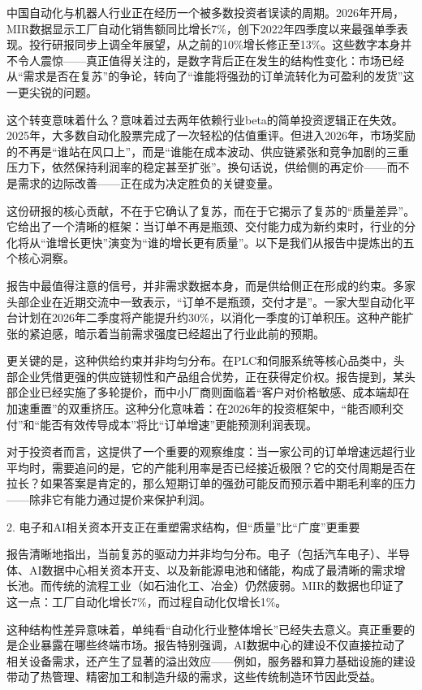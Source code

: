 \documentclass[11pt]{ctexart}
\begin{document}
中国自动化与机器人行业正在经历一个被多数投资者误读的周期。2026年开局，MIR数据显示工厂自动化销售额同比增长7\%，创下2022年四季度以来最强单季表现。投行研报同步上调全年展望，从之前的10\%增长修正至13\%。这些数字本身并不令人震惊——真正值得关注的，是数字背后正在发生的结构性变化：市场已经从“需求是否在复苏”的争论，转向了“谁能将强劲的订单流转化为可盈利的发货”这一更尖锐的问题。

这个转变意味着什么？意味着过去两年依赖行业beta的简单投资逻辑正在失效。2025年，大多数自动化股票完成了一次轻松的估值重评。但进入2026年，市场奖励的不再是“谁站在风口上”，而是“谁能在成本波动、供应链紧张和竞争加剧的三重压力下，依然保持利润率的稳定甚至扩张”。换句话说，供给侧的再定价——而不是需求的边际改善——正在成为决定胜负的关键变量。

这份研报的核心贡献，不在于它确认了复苏，而在于它揭示了复苏的“质量差异”。它给出了一个清晰的框架：当订单不再是瓶颈、交付能力成为新约束时，行业的分化将从“谁增长更快”演变为“谁的增长更有质量”。以下是我们从报告中提炼出的五个核心洞察。

报告中最值得注意的信号，并非需求数据本身，而是供给侧正在形成的约束。多家头部企业在近期交流中一致表示，“订单不是瓶颈，交付才是”。一家大型自动化平台计划在2026年二季度将产能提升约30\%，以消化一季度的订单积压。这种产能扩张的紧迫感，暗示着当前需求强度已经超出了行业此前的预期。

更关键的是，这种供给约束并非均匀分布。在PLC和伺服系统等核心品类中，头部企业凭借更强的供应链韧性和产品组合优势，正在获得定价权。报告提到，某头部企业已经实施了多轮提价，而中小厂商则面临着“客户对价格敏感、成本端却在加速重置”的双重挤压。这种分化意味着：在2026年的投资框架中，“能否顺利交付”和“能否有效传导成本”将比“订单增速”更能预测利润表现。

对于投资者而言，这提供了一个重要的观察维度：当一家公司的订单增速远超行业平均时，需要追问的是，它的产能利用率是否已经接近极限？它的交付周期是否在拉长？如果答案是肯定的，那么短期订单的强劲可能反而预示着中期毛利率的压力——除非它有能力通过提价来保护利润。

2. 电子和AI相关资本开支正在重塑需求结构，但“质量”比“广度”更重要

报告清晰地指出，当前复苏的驱动力并非均匀分布。电子（包括汽车电子）、半导体、AI数据中心相关资本开支、以及新能源电池和储能，构成了最清晰的需求增长池。而传统的流程工业（如石油化工、冶金）仍然疲弱。MIR的数据也印证了这一点：工厂自动化增长7\%，而过程自动化仅增长1\%。

这种结构性差异意味着，单纯看“自动化行业整体增长”已经失去意义。真正重要的是企业暴露在哪些终端市场。报告特别强调，AI数据中心的建设不仅直接拉动了相关设备需求，还产生了显著的溢出效应——例如，服务器和算力基础设施的建设带动了热管理、精密加工和制造升级的需求，这些传统制造环节因此受益。
\end{document}
